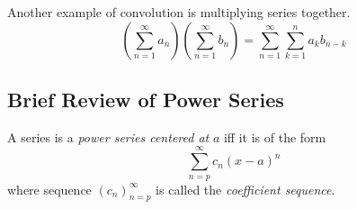 \documentclass[notes]{subfiles}
\begin{document}
Another example of convolution is multiplying series together.
\[
    \left( \sum_{n = 1}^\infty a_n \right)\left( \sum_{n = 1}^\infty b_n \right) = \sum_{n = 1}^\infty \sum_{k = 1}^n a_k b_{n - k}
\]

\subsection{Brief Review of Power Series}
\begin{definition}
    A series is a \textsl{power series centered at} $a$ iff it is of the form
    \[
        \sum_{n = p}^\infty c_n(x - a)^n
    \]
    where sequence $(c_n)_{n = p}^\infty$ is called the \textsl{coefficient sequence}. 
\end{definition}
\end{document}
